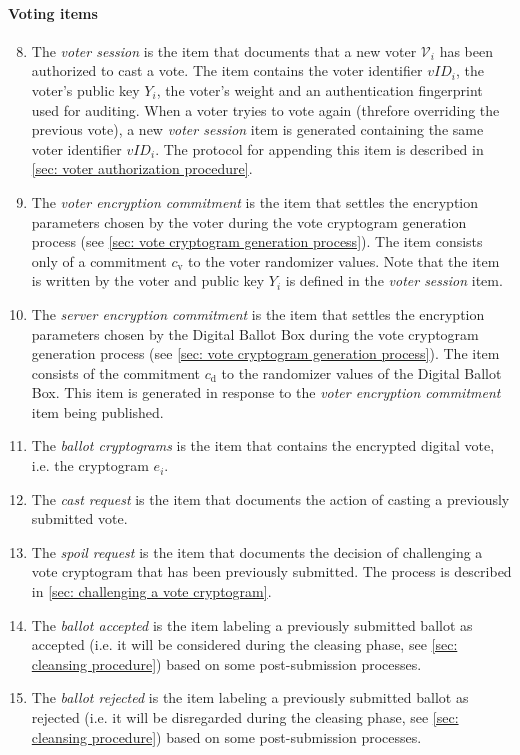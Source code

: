 \paragraph{Voting items}
\begin{enumerate}
    \setcounter{enumi}{7}
    \item The \textit{voter session} is the item that documents that a new voter $\mathcal{V}_i$ has been authorized to cast a vote. The item contains the voter identifier $vID_i$, the voter's public key $Y_i$, the voter's weight and an authentication fingerprint used for auditing. When a voter tryies to vote again (threfore overriding the previous vote), a new \textit{voter session} item is generated containing the same voter identifier $vID_i$. The protocol for appending this item is described in \cref{sec: voter authorization procedure}.

    \item The \textit{voter encryption commitment} is the item that settles the encryption parameters chosen by the voter during the vote cryptogram generation process (see \cref{sec: vote cryptogram generation process}). The item consists only of a commitment $c_\mathrm{v}$ to the voter randomizer values. Note that the item is written by the voter and public key $Y_i$ is defined in the \textit{voter session} item.
    
    \item The \textit{server encryption commitment} is the item that settles the encryption parameters chosen by the Digital Ballot Box during the vote cryptogram generation process (see \cref{sec: vote cryptogram generation process}). The item consists of the commitment $c_\mathrm{d}$ to the randomizer values of the Digital Ballot Box. This item is generated in response to the \textit{voter encryption commitment} item being published.
    
    \item The \textit{ballot cryptograms} is the item that contains the encrypted digital vote, i.e. the cryptogram $e_i$.
    
    \item The \textit{cast request} is the item that documents the action of casting a previously submitted vote.
    
    \item The \textit{spoil request} is the item that documents the decision of challenging a vote cryptogram that has been previously submitted. The process is described in \cref{sec: challenging a vote cryptogram}.
    
    \item The \textit{ballot accepted} is the item labeling a previously submitted ballot as accepted (i.e. it will be considered during the cleasing phase, see \cref{sec: cleansing procedure}) based on some post-submission processes.
    
    \item The \textit{ballot rejected} is the item labeling a previously submitted ballot as rejected (i.e. it will be disregarded during the cleasing phase, see \cref{sec: cleansing procedure}) based on some post-submission processes.
\end{enumerate}


